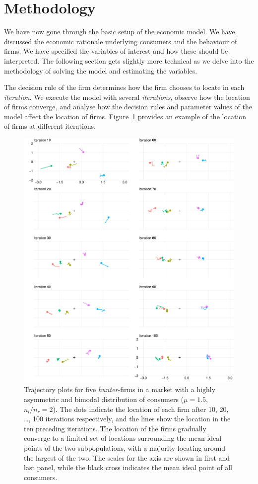 \documentclass[preprint, 12pt]{elsarticle}
\begin{document}
\section{Methodology} %

We have now gone through the basic setup of the economic model. We have discussed the economic rationale underlying consumers and the behaviour of firms. We have specified the variables of interest and how these should be interpreted. The following section gets slightly more technical as we delve into the methodology of solving the model and estimating the variables.

The decision rule of the firm determines how the firm chooses to locate in each \emph{iteration}. We execute the model with several \emph{iterations}, observe how the location of firms converge, and analyse how the decision rules and parameter values of the model affect the location of firms. Figure~\ref{fig:movement} provides an example of the location of firms at different iterations.

\begin{figure}[htp!]
	\centering
	\includegraphics[width=\textwidth, trim={8mm 0 0 0}]{Graphics/figm.pdf}
	\caption{Trajectory plots for five \emph{hunter}-firms in a market with a highly asymmetric and bimodal distribution of consumers ($\mu=1.5$, $n_l/n_r=2$). The dots indicate the location of each firm after 10, 20, \dots, 100 iterations respectively, and the lines show the location in the ten preceding iterations. The location of the firms gradually converge to a limited set of locations surrounding the mean ideal points of the two subpopulations, with a majority locating around the largest of the two. The scales for the axis are shown in first and last panel, while the black cross indicates the mean ideal point of all consumers.}
	\label{fig:movement}
\end{figure}
\end{document}

